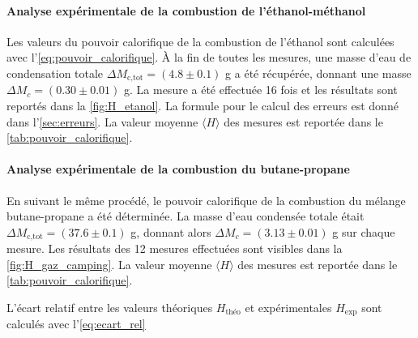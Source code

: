 \paragraph*{Analyse expérimentale de la combustion de l'éthanol-méthanol}
Les valeurs du pouvoir calorifique de la combustion de l'éthanol sont calculées avec l'\autoref{eq:pouvoir_calorifique}. À la fin de toutes les mesures, une masse d'eau de condensation totale \(\Delta M_\textrm{c,tot} = (4.8 \pm 0.1)\) \si{\gram} a été récupérée, donnant une masse \(\Delta M_c = (0.30 \pm 0.01)\) \si{\gram}. La mesure a été effectuée 16 fois et les résultats sont reportés dans la \autoref{fig:H_etanol}. La formule pour le calcul des erreurs est donné dans l'\autoref{sec:erreurs}. La valeur moyenne \(\langle H \rangle\) des mesures est reportée dans le \autoref{tab:pouvoir_calorifique}.

\paragraph*{Analyse expérimentale de la combustion du butane-propane}
En suivant le même procédé, le pouvoir calorifique de la combustion du mélange butane-propane a été déterminée. La masse d'eau condensée totale était \(\Delta M_\textrm{c,tot} = (37.6 \pm 0.1)\) \si{\gram}, donnant alors \(\Delta M_c = (3.13 \pm 0.01)\) \si{\gram} sur chaque mesure. Les résultats des 12 mesures effectuées sont visibles dans la \autoref{fig:H_gaz_camping}. La valeur moyenne \(\langle H \rangle\) des mesures est reportée dans le \autoref{tab:pouvoir_calorifique}.

L'écart relatif entre les valeurs théoriques \(H_\textrm{théo}\) et expérimentales \(H_\textrm{exp}\) sont calculés avec l'\autoref{eq:ecart_rel}

